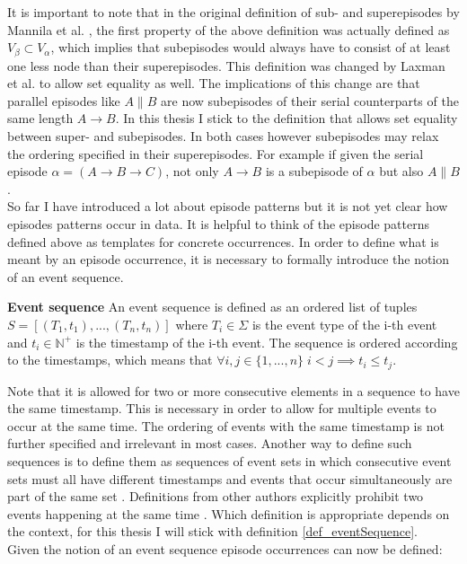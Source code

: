 It is important to note that in the original definition of sub- and superepisodes by Mannila et al. \cite{mannila1995discovering}, the first property of the above definition was actually defined as $V_\beta \subset V_\alpha$, which implies that subepisodes would always have to consist of at least one less node than their superepisodes. This definition was changed by Laxman et al. \cite{laxman2007fast} to allow set equality as well. The implications of this change are that parallel episodes like $A \| B$ are now subepisodes of their serial counterparts of the same length $A \rightarrow B$. In this thesis I stick to the definition that allows set equality between super- and subepisodes. In both cases however subepisodes may relax the ordering specified in their superepisodes. For example if given the serial episode $\alpha =( A \rightarrow B \rightarrow C )$, not only $A \rightarrow B$ is a subepisode of $\alpha$ but also $A \| B$. \\
So far I have introduced a lot about episode patterns but it is not yet clear how episodes patterns occur in data. It is helpful to think of the episode patterns defined above as templates for concrete occurrences. In order to define what is meant by an episode occurrence, it is necessary to formally introduce the notion of an event sequence.

\begin{mydef}
\label{def_eventSequence}
\textbf{Event sequence} An event sequence is defined as an ordered list of tuples $S = [ (T_1,t_1),..., (T_n,t_n) ] $ where $T_i \in \Sigma$ is the event type of the i-th event and $t_i \in \mathbb{N}^+$ is the timestamp of the i-th event. The sequence is ordered according to the timestamps, which means that $\forall i,j \in \{1,...,n\} \; i<j \implies t_i \leq t_j$. \cite{mannila1997discovery} 
\end{mydef}

Note that it is allowed for two or more consecutive elements in a sequence to have the same timestamp. This is necessary in order to allow for multiple events to occur at the same time. The ordering of events with the same timestamp is not further specified and irrelevant in most cases. Another way to define such sequences is to define them as sequences of event sets in which consecutive event sets must all have different timestamps and events that occur simultaneously are part of the same set \cite{bathoorn2007finding}. Definitions from other authors explicitly prohibit two events happening at the same time \cite{baumgarten2003tree}. Which definition is appropriate depends on the context, for this thesis I will stick with definition \ref{def_eventSequence}. \\
Given the notion of an event sequence episode occurrences can now be defined:

